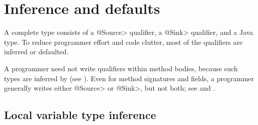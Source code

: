 %
%
%
%
%
%
%
%  

  \section{Inference and defaults}
 \label{sec:system:defaults}
 
 A complete type consists of a \<@Source> qualifier, a \<@Sink> qualifier,
 and a Java type.  To reduce programmer effort and code clutter, most of the
 qualifiers are inferred or defaulted.  
 
 A programmer need not write qualifiers within method bodies,
 because such types are inferred by \theFlowChecker (see ).
 Even for method signatures and
 fields, a programmer generally writes either \<@Source> or
 \<@Sink>, but not both; see  and 
.

\subsection{Local variable type inference}
\label{sec:type-inference}

